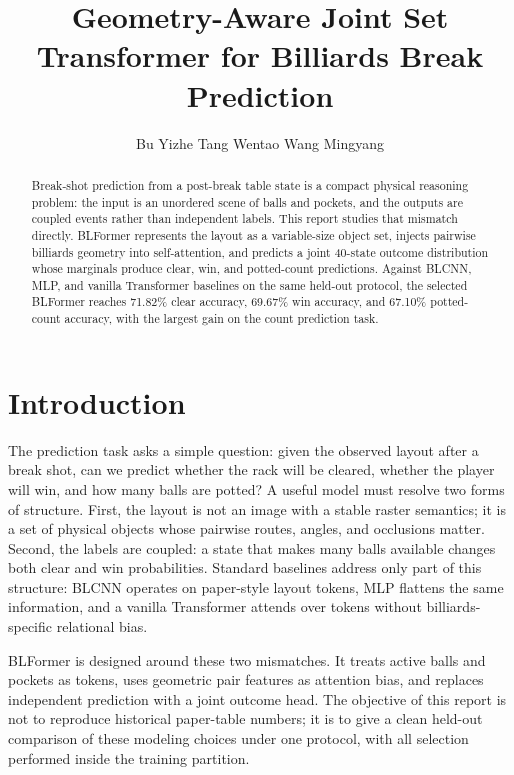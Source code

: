 \documentclass[12pt]{article}
\title{\vspace{-1.1em}Geometry-Aware Joint Set Transformer for Billiards Break Prediction}
\author{Bu Yizhe \quad Tang Wentao \quad Wang Mingyang}
\date{}
\begin{document}
\maketitle
\vspace{-1.4em}

\begin{abstract}
Break-shot prediction from a post-break table state is a compact physical reasoning problem: the input is an unordered scene of balls and pockets, and the outputs are coupled events rather than independent labels.  This report studies that mismatch directly.  BLFormer represents the layout as a variable-size object set, injects pairwise billiards geometry into self-attention, and predicts a joint 40-state outcome distribution whose marginals produce clear, win, and potted-count predictions.  Against BLCNN, MLP, and vanilla Transformer baselines on the same held-out protocol, the selected BLFormer reaches 71.82\% clear accuracy, 69.67\% win accuracy, and 67.10\% potted-count accuracy, with the largest gain on the count prediction task.
\end{abstract}
\vspace{-0.7em}

\section{Introduction}
The prediction task asks a simple question: given the observed layout after a break shot, can we predict whether the rack will be cleared, whether the player will win, and how many balls are potted?  A useful model must resolve two forms of structure.  First, the layout is not an image with a stable raster semantics; it is a set of physical objects whose pairwise routes, angles, and occlusions matter.  Second, the labels are coupled: a state that makes many balls available changes both clear and win probabilities.  Standard baselines address only part of this structure: BLCNN operates on paper-style layout tokens, MLP flattens the same information, and a vanilla Transformer attends over tokens without billiards-specific relational bias.

BLFormer is designed around these two mismatches.  It treats active balls and pockets as tokens, uses geometric pair features as attention bias, and replaces independent prediction with a joint outcome head.  The objective of this report is not to reproduce historical paper-table numbers; it is to give a clean held-out comparison of these modeling choices under one protocol, with all selection performed inside the training partition.
\end{document}
